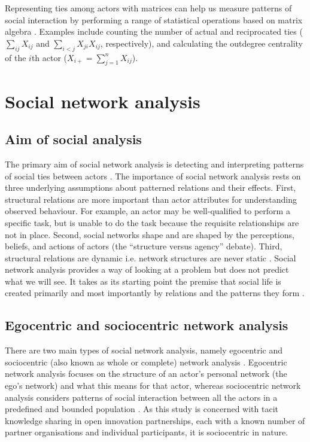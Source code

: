 Representing ties among actors with matrices can help us measure patterns of social interaction by performing a range of statistical operations based on matrix algebra \citep{anderson1999p}. Examples include counting the number of actual and reciprocated ties ($\sum_{ij}X_{ij}$ and $\sum_{i<j}X_{ji}X_{ij}$, respectively), and calculating the outdegree centrality of the $i$th actor ($X_{i+} = \sum_{j=1}^{n} X_{ij}$). \medskip

\section{Social network analysis}

\subsection{Aim of social analysis}

The primary aim of social network analysis is detecting and interpreting patterns of social ties between actors \citep{de2011exploratory}. The importance of social network analysis rests on three underlying assumptions about patterned relations and their effects. First, structural relations are more important than actor attributes for understanding observed behaviour. For example, an actor may be well-qualified to perform a specific task, but is unable to do the task because the requisite relationships are not in place. Second, social networks shape and are shaped by the perceptions, beliefs, and actions of actors (the \enquote{structure versus agency} debate). Third, structural relations are dynamic i.e. network structures are never static \citep{knoke2008social}. Social network analysis provides a way of looking at a problem but does not predict what we will see. It takes as its starting point the premise that social life is created primarily and most importantly by relations and the patterns they form \citep{scott2011sage}. \medskip

\subsection{Egocentric and sociocentric network analysis}

There are two main types of social network analysis, namely egocentric and sociocentric (also known as whole or complete) network analysis \citep{kilduff2003social}. Egocentric network analysis focuses on the structure of an actor's personal network (the ego's network) and what this means for that actor, whereas sociocentric network analysis considers patterns of social interaction between all the actors in a predefined and bounded population \citep{provan2007interorganizational}. As this study is concerned with tacit knowledge sharing in open innovation partnerships, each with a known number of partner organisations and individual participants, it is sociocentric in nature. \medskip

